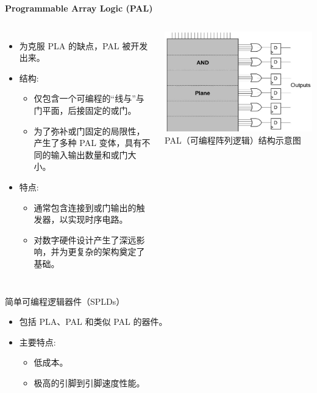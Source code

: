 \begin{frame}[allowframebreaks]{\textbf{Programmable Array Logic (PAL)}}
\begin{columns}[T]
\begin{itemize}
\tightlist
\item 为克服 PLA 的缺点，PAL 被开发出来。
\item 结构:
\begin{itemize}
\tightlist
\item 仅包含一个可编程的``线与''与门平面，后接固定的或门。
\item 为了弥补或门固定的局限性，产生了多种 PAL 变体，具有不同的输入输出数量和或门大小。
\end{itemize}
\item 特点:
\begin{itemize}
\tightlist
\item 通常包含连接到或门输出的触发器，以实现时序电路。
\item 对数字硬件设计产生了深远影响，并为更复杂的架构奠定了基础。
\end{itemize}
\end{itemize}

\begin{center}
\includegraphics[width=\textwidth, height=0.6\textheight, keepaspectratio]{img1/PAL.jpeg}\\
PAL（可编程阵列逻辑）结构示意图
\end{center}
\end{columns}
\end{frame}

\begin{frame}{简单可编程逻辑器件（SPLDs）}
\begin{itemize}
\tightlist
\item
    包括 PLA、PAL 和类似 PAL 的器件。
\item
    主要特点:

    \begin{itemize}
    \tightlist
    \item
    低成本。
    \item
    极高的引脚到引脚速度性能。
    \end{itemize}
\end{itemize}
\end{frame}

